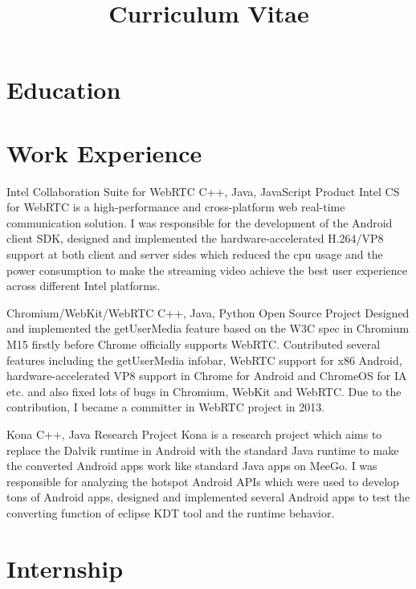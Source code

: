 \documentclass[11pt, a4paper]{moderncv}
\title{Curriculum Vitae}
\begin{document}
\maketitle

\section{Education}

\section{Work Experience}
{Intel Collaboration Suite for WebRTC}
{C++, Java, JavaScript}
{Product}{}
{
Intel CS for WebRTC is a high-performance and cross-platform web real-time communication solution. I was responsible for the development of the Android client SDK, designed and implemented the hardware-accelerated H.264/VP8 support at both client and server sides which reduced the cpu usage and the power consumption to make the streaming video achieve the best user experience across different Intel platforms.
}

\vspace*{0.2\baselineskip}
{Chromium/WebKit/WebRTC}
{C++, Java, Python}
{Open Source Project}{}
{
Designed and implemented the getUserMedia feature based on the W3C spec in Chromium M15 firstly before Chrome officially supports WebRTC. Contributed several features including the getUserMedia infobar, WebRTC support for x86 Android, hardware-accelerated VP8 support in Chrome for Android and ChromeOS for IA etc. and also fixed lots of bugs in Chromium, WebKit and WebRTC. Due to the contribution, I became a committer in WebRTC project in 2013.
}

\vspace*{0.2\baselineskip}
{Kona}
{C++, Java}
{Research Project}{}
{
Kona is a research project which aims to replace the Dalvik runtime in Android with the standard Java runtime to make the converted Android apps work like standard Java apps on MeeGo. I was responsible for analyzing the hotspot Android APIs which were used to develop tons of Android apps, designed and implemented several Android apps to test the converting function of eclipse KDT tool and the runtime behavior.
}

\section{Internship}
\end{document}
